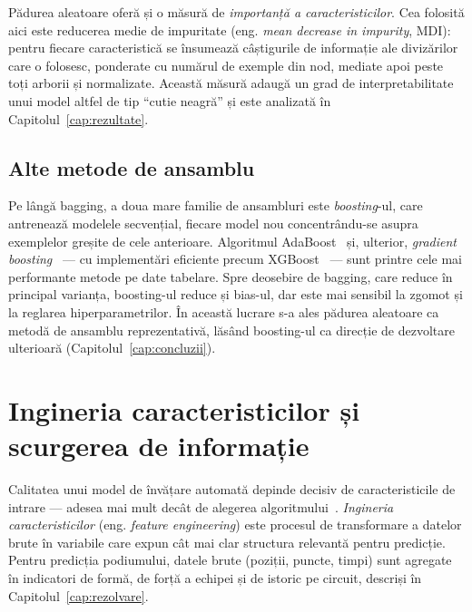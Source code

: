 \documentclass[12pt,a4paper]{report}
\begin{document}
Pădurea aleatoare oferă și o măsură de \emph{importanță a caracteristicilor}. Cea folosită aici
este reducerea medie de impuritate (eng. \emph{mean decrease in impurity}, MDI): pentru fiecare
caracteristică se însumează câștigurile de informație ale divizărilor care o folosesc, ponderate
cu numărul de exemple din nod, mediate apoi peste toți arborii și normalizate. Această măsură
adaugă un grad de interpretabilitate unui model altfel de tip ``cutie neagră'' și este analizată
în Capitolul~\ref{cap:rezultate}.

\subsection{Alte metode de ansamblu}

Pe lângă bagging, a doua mare familie de ansambluri este \emph{boosting}-ul, care antrenează
modelele secvențial, fiecare model nou concentrându-se asupra exemplelor greșite de cele
anterioare. Algoritmul AdaBoost~\cite{freund1997decision} și, ulterior, \emph{gradient
boosting}~\cite{friedman2001greedy} --- cu implementări eficiente precum
XGBoost~\cite{chen2016xgboost} --- sunt printre cele mai performante metode pe date tabelare.
Spre deosebire de bagging, care reduce în principal varianța, boosting-ul reduce și bias-ul, dar
este mai sensibil la zgomot și la reglarea hiperparametrilor. În această lucrare s-a ales pădurea
aleatoare ca metodă de ansamblu reprezentativă, lăsând boosting-ul ca direcție de dezvoltare
ulterioară (Capitolul~\ref{cap:concluzii}).

\section{Ingineria caracteristicilor și scurgerea de informație}
\label{sec:leakage}

Calitatea unui model de învățare automată depinde decisiv de caracteristicile de intrare ---
adesea mai mult decât de alegerea algoritmului~\cite{james2013introduction}. \emph{Ingineria
caracteristicilor} (eng. \emph{feature engineering}) este procesul de transformare a datelor
brute în variabile care expun cât mai clar structura relevantă pentru predicție. Pentru
predicția podiumului, datele brute (poziții, puncte, timpi) sunt agregate în indicatori de formă,
de forță a echipei și de istoric pe circuit, descriși în Capitolul~\ref{cap:rezolvare}.
\end{document}
